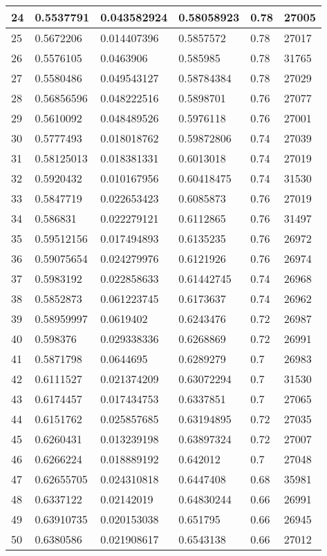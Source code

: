 \begin{longtable}{|l|l|l|l|l|l|}
24 & 0.5537791 & 0.043582924 & 0.58058923 & 0.78 & 27005 \\ \hline 
25 & 0.5672206 & 0.014407396 & 0.5857572 & 0.78 & 27017 \\ \hline 
26 & 0.5576105 & 0.0463906 & 0.585985 & 0.78 & 31765 \\ \hline 
27 & 0.5580486 & 0.049543127 & 0.58784384 & 0.78 & 27029 \\ \hline 
28 & 0.56856596 & 0.048222516 & 0.5898701 & 0.76 & 27077 \\ \hline 
29 & 0.5610092 & 0.048489526 & 0.5976118 & 0.76 & 27001 \\ \hline 
30 & 0.5777493 & 0.018018762 & 0.59872806 & 0.74 & 27039 \\ \hline 
31 & 0.58125013 & 0.018381331 & 0.6013018 & 0.74 & 27019 \\ \hline 
32 & 0.5920432 & 0.010167956 & 0.60418475 & 0.74 & 31530 \\ \hline 
33 & 0.5847719 & 0.022653423 & 0.6085873 & 0.76 & 27019 \\ \hline 
34 & 0.586831 & 0.022279121 & 0.6112865 & 0.76 & 31497 \\ \hline 
35 & 0.59512156 & 0.017494893 & 0.6135235 & 0.76 & 26972 \\ \hline 
36 & 0.59075654 & 0.024279976 & 0.6121926 & 0.76 & 26974 \\ \hline 
37 & 0.5983192 & 0.022858633 & 0.61442745 & 0.74 & 26968 \\ \hline 
38 & 0.5852873 & 0.061223745 & 0.6173637 & 0.74 & 26962 \\ \hline 
39 & 0.58959997 & 0.0619402 & 0.6243476 & 0.72 & 26987 \\ \hline 
40 & 0.598376 & 0.029338336 & 0.6268869 & 0.72 & 26991 \\ \hline 
41 & 0.5871798 & 0.0644695 & 0.6289279 & 0.7 & 26983 \\ \hline 
42 & 0.6111527 & 0.021374209 & 0.63072294 & 0.7 & 31530 \\ \hline 
43 & 0.6174457 & 0.017434753 & 0.6337851 & 0.7 & 27065 \\ \hline 
44 & 0.6151762 & 0.025857685 & 0.63194895 & 0.72 & 27035 \\ \hline 
45 & 0.6260431 & 0.013239198 & 0.63897324 & 0.72 & 27007 \\ \hline 
46 & 0.6266224 & 0.018889192 & 0.642012 & 0.7 & 27048 \\ \hline 
47 & 0.62655705 & 0.024310818 & 0.6447408 & 0.68 & 35981 \\ \hline 
48 & 0.6337122 & 0.02142019 & 0.64830244 & 0.66 & 26991 \\ \hline 
49 & 0.63910735 & 0.020153038 & 0.651795 & 0.66 & 26945 \\ \hline 
50 & 0.6380586 & 0.021908617 & 0.6543138 & 0.66 & 27012 \\ \hline 
\end{longtable}